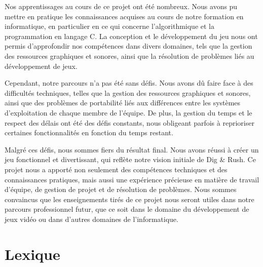 \documentclass[a4paper,12pt]{article}
\begin{document}
Nos apprentissages au cours de ce projet ont été nombreux. Nous avons pu mettre en pratique les connaissances acquises au cours de notre formation en informatique, en particulier en ce qui concerne l'algorithmique et la programmation en langage C. La conception et le développement du jeu nous ont permis d'approfondir nos compétences dans divers domaines, tels que la gestion des ressources graphiques et sonores, ainsi que la résolution de problèmes liés au développement de jeux.

Cependant, notre parcours n'a pas été sans défis. Nous avons dû faire face à des difficultés techniques, telles que la gestion des ressources graphiques et sonores, ainsi que des problèmes de portabilité liés aux différences entre les systèmes d'exploitation de chaque membre de l'équipe. De plus, la gestion du temps et le respect des délais ont été des défis constants, nous obligeant parfois à reprioriser certaines fonctionnalités en fonction du temps restant.

Malgré ces défis, nous sommes fiers du résultat final. Nous avons réussi à créer un jeu fonctionnel et divertissant, qui reflète notre vision initiale de Dig \& Rush. Ce projet nous a apporté non seulement des compétences techniques et des connaissances pratiques, mais aussi une expérience précieuse en matière de travail d'équipe, de gestion de projet et de résolution de problèmes. Nous sommes convaincus que les enseignements tirés de ce projet nous seront utiles dans notre parcours professionnel futur, que ce soit dans le domaine du développement de jeux vidéo ou dans d'autres domaines de l'informatique.

\newpage
\appendix

\section{Lexique}
\end{document}
